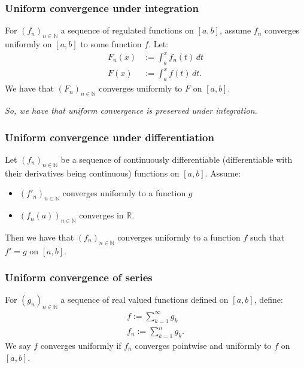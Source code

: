 \documentclass[a4paper, 12pt, twoside]{article}
\begin{document}
\subsubsection{Uniform convergence under integration}

For $(f_n)_{n\in\mathbb{N}}$ a sequence of regulated functions on $[a, b]$,
assume $f_n$ converges uniformly on $[a, b]$ to some function $f$. Let:
\begin{align*}
      F_n(x) & := \int_a^x f_n(t) \, dt \\
      F(x)   & := \int_a^x f(t) \, dt.
\end{align*}
We have that $(F_n)_{n\in\mathbb{N}}$ converges uniformly to $F$ on $[a,b]$.

\vspace{\baselineskip}

\textit{So, we have that uniform convergence is preserved under integration.}

\subsubsection{Uniform convergence under differentiation}

Let $(f_n)_{n\in\mathbb{N}}$ be a sequence of continuously differentiable
(differentiable with their derivatives being continuous) functions on $[a, b]$.
Assume:

\begin{itemize}
      \item $(f'_n)_{n\in\mathbb{N}}$ converges uniformly to a function $g$
      \item $(f_n(a))_{n\in\mathbb{N}}$ converges in $\mathbb{R}$.
\end{itemize}

Then we have that $(f_n)_{n\in\mathbb{N}}$ converges uniformly to a function
$f$ such that $f' = g$ on $[a, b]$.

\subsubsection{Uniform convergence of series}

For $(g_n)_{n\in\mathbb{N}}$ a sequence of real valued functions defined on
$[a, b]$, define:
\begin{align*}
      f := \sum_{k = 1}^\infty g_k \\
      f_n := \sum_{k = 1}^n g_k.
\end{align*}
We say $f$ converges uniformly if $f_n$ converges pointwise and uniformly to
$f$ on $[a, b]$.
\end{document}

